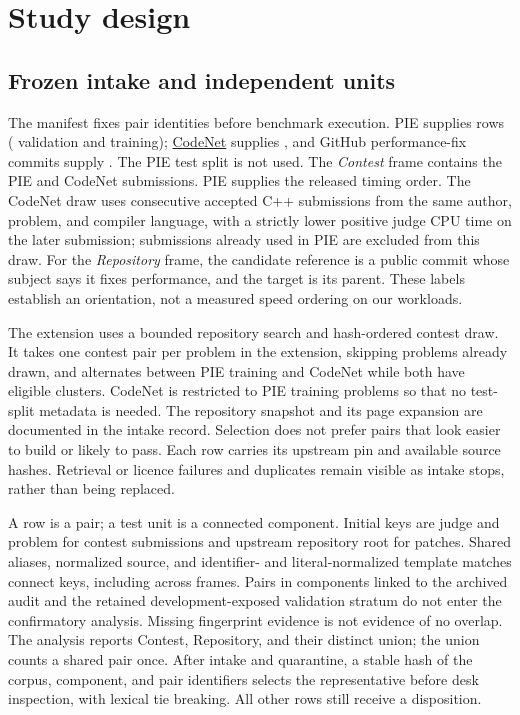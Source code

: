 \documentclass[11pt]{article}
\begin{document}
\section{Study design}
\label{sec:design}

\subsection{Frozen intake and independent units}

The manifest fixes \BenchPairs{} pair identities before benchmark execution.
PIE supplies \BenchPIE{} rows (\BenchVal{} validation and \BenchTrain{}
training); \href{https://openreview.net/forum?id=6vZVBkCDrHT}{CodeNet}
supplies \BenchCodeNet{}, and GitHub performance-fix commits supply
\BenchGitHub{}. The PIE test split is not used.
The \emph{Contest} frame contains the PIE and CodeNet submissions. PIE
supplies the released timing order. The CodeNet draw uses consecutive
accepted C++ submissions from the same author, problem, and compiler
language, with a strictly lower positive judge CPU time on the later
submission; submissions already used in PIE are excluded from this draw.
For the \emph{Repository} frame, the candidate reference is a public
commit whose subject says it fixes performance, and the target is its
parent. These labels establish an orientation, not a measured speed
ordering on our workloads.

The extension uses a bounded repository search and hash-ordered contest
draw. It takes one contest pair per problem in the extension, skipping
problems already drawn, and alternates between PIE training and CodeNet while
both have eligible clusters. CodeNet is restricted to PIE training problems
so that no test-split metadata is needed. The repository snapshot and its
page expansion are documented in the intake record. Selection does not
prefer pairs that look easier to build or likely to pass. Each row carries
its upstream pin and available source hashes. Retrieval or licence failures
and duplicates remain visible as intake stops, rather than being replaced.

A row is a pair; a test unit is a connected component. Initial keys are
judge and problem for contest submissions and upstream repository root for
patches. Shared aliases, normalized source, and identifier- and
literal-normalized template matches connect keys, including across frames.
Pairs in components linked to the archived audit and the retained
development-exposed validation stratum do not enter the confirmatory
analysis. Missing fingerprint evidence is not evidence of no overlap.
The analysis reports Contest, Repository, and their distinct union; the
union counts a shared pair once. After intake and quarantine, a stable
hash of the corpus, component, and pair identifiers selects the
representative before desk inspection, with lexical tie breaking. All
other rows still receive a disposition.
\end{document}
